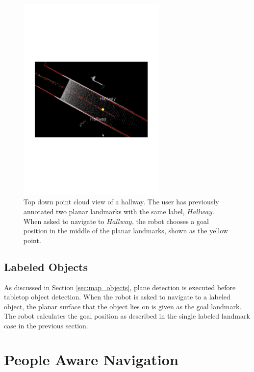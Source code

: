 \begin{figure}[ht!]
\centering
\includegraphics[width=0.65\textwidth]{pics/double_plane}
\caption{Top down point cloud view of a hallway. The user has previously annotated two planar landmarks with the same label, $Hallway$. When asked to navigate to $Hallway$, the robot chooses a goal position in the middle of the planar landmarks, shown as the yellow point.}
\label{fig:double_plane}
\end{figure}


\subsection{Labeled Objects} As discussed in Section \ref{sec:map_objects}, plane detection is executed before tabletop object detection. When the robot is asked to navigate to a labeled object, the planar surface that the object lies on is given as the goal landmark. The robot calculates the goal position as described in the single labeled landmark case in the previous section.

\section{People Aware Navigation}
\label{sec:navigation_people_aware_navigation}


